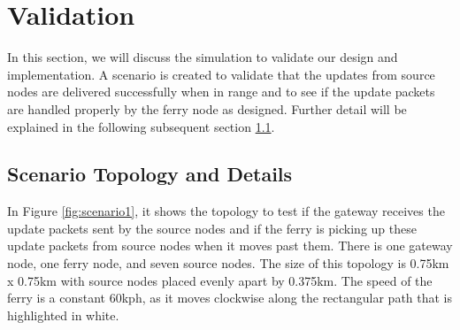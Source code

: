 %

\section{Validation} %

In this section, we will discuss the simulation to validate our design and implementation. 
A scenario is created to validate that the updates from source nodes are delivered successfully when in range and to see if the update packets are handled properly by the ferry node as designed.   
Further detail will be explained in the following subsequent section \ref{sec:scenario1}.



\subsection{Scenario Topology  and Details}
\label{sec:scenario1}


In Figure \ref{fig:scenario1}, it shows the topology to test if the gateway receives the update packets sent by the source nodes and if the ferry is picking up these update packets from source nodes when it moves past them.
There is one gateway node, one ferry node, and seven source nodes. 
The size of this topology is 0.75km x 0.75km with source nodes placed evenly apart by 0.375km.  
The speed of the ferry is a constant 60kph, as it moves clockwise along the rectangular path that is highlighted in white.


